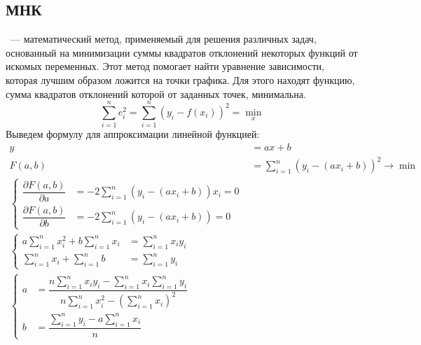 \subsection{МНК}
~--- математический метод, применяемый для решения различных задач, основанный на минимизации суммы квадратов отклонений некоторых функций от искомых переменных. Этот метод помогает найти уравнение зависимости, которая лучшим образом ложится на точки графика. Для этого находят функцию, сумма квадратов отклонений которой от заданных точек, минимальна.
\begin{equation}
\sum\limits_{i=1}^n e_i^2 = \sum\limits_{i=1}^n (y_i - f(x_i))^2 = \min_x
\end{equation}
Выведем формулу для аппроксимации линейной функцией:
\begin{align*}
y &= ax + b\\
F(a,b) &= \sum\limits_{i=1}^n(y_i-(ax_i + b))^2 \rightarrow \min\\
\begin{cases}
\dfrac{\partial  F(a,b)}{\partial a} &= -2\sum\limits_{i=1}^n(y_i-(ax_i + b))x_i = 0\\
\dfrac{\partial  F(a,b)}{\partial b} &= -2\sum\limits_{i=1}^n(y_i-(ax_i + b)) = 0
\end{cases}\\
\begin{cases}
a \sum\limits_{i=1}^n x_i^2 + b \sum\limits_{i=1}^n x_i &= \sum\limits_{i=1}^n x_iy_i\\
 \sum\limits_{i=1}^n x_i + \sum\limits_{i=1}^n b &= \sum\limits_{i=1}^n y_i
\end{cases}\\
\begin{cases}
a &= \dfrac{n\sum\limits_{i=1}^n x_i y_i - \sum\limits_{i=1}^n x_i \sum\limits_{i=1}^n y_i}{n \sum\limits_{i=1}^n x_i^2 - (\sum\limits_{i=1}^n x_i)^2}\\
b &= \dfrac{\sum\limits_{i=1}^n y_i - a \sum\limits_{i=1}^n x_i}{n}
\end{cases}
\end{align*}

